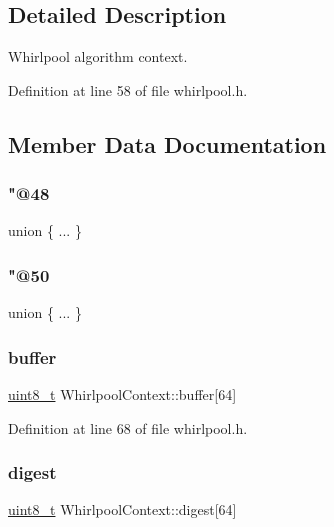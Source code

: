 \subsection{Detailed Description}
Whirlpool algorithm context. 

Definition at line 58 of file whirlpool.\+h.



\subsection{Member Data Documentation}
\mbox{\label{structWhirlpoolContext_a2c8bd8e3c86f366bc29156e5ea8cb2cf}} 
\subsubsection{\texorpdfstring{"@48}{@48}}
{\footnotesize\ttfamily union \{ ... \} }

\mbox{\label{structWhirlpoolContext_ab2c02875049d34d54666fb11969b60b4}} 
\subsubsection{\texorpdfstring{"@50}{@50}}
{\footnotesize\ttfamily union \{ ... \} }

\mbox{\label{structWhirlpoolContext_a884c918532249ee9bb31e50ef88bfb07}} 
\subsubsection{\texorpdfstring{buffer}{buffer}}
{\footnotesize\ttfamily \hyperlink{stdint_8h_aba7bc1797add20fe3efdf37ced1182c5}{uint8\+\_\+t} Whirlpool\+Context\+::buffer\mbox{[}64\mbox{]}}



Definition at line 68 of file whirlpool.\+h.

\mbox{\label{structWhirlpoolContext_a797f258a426a4f5f2de2f3572cb02e25}} 
\subsubsection{\texorpdfstring{digest}{digest}}
{\footnotesize\ttfamily \hyperlink{stdint_8h_aba7bc1797add20fe3efdf37ced1182c5}{uint8\+\_\+t} Whirlpool\+Context\+::digest\mbox{[}64\mbox{]}}



